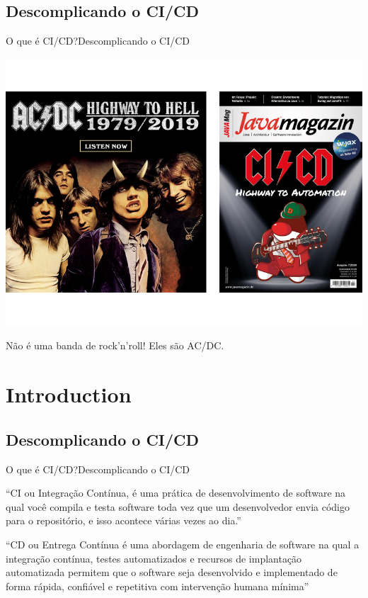 \documentclass[10pt]{beamer}
\begin{document}
\subsection{Descomplicando o CI/CD}
\begin{frame}{O que é CI/CD?}{Descomplicando o CI/CD}
  \begin{center}
    \includegraphics[scale=0.38]{images/acdc.png}
  \end{center}
   \begin{center}
      Não é uma banda de rock'n'roll! Eles são AC/DC.
   \end{center}
\end{frame}

\section{Introduction}
\subsection{Descomplicando o CI/CD}
\begin{frame}{O que é CI/CD?}{Descomplicando o CI/CD}
    \begin{center}
      ``CI ou Integração Contínua, é uma prática de desenvolvimento de software na qual você compila e testa software toda vez que um desenvolvedor envia código para o repositório, e isso acontece várias vezes ao dia.''
      
      ``CD ou Entrega Contínua é uma abordagem de engenharia de software na qual a integração contínua, testes automatizados e recursos de implantação automatizada permitem que o software seja desenvolvido e implementado de forma rápida, confiável e repetitiva com intervenção humana mínima''
    \end{center}
\end{frame}
\end{document}
